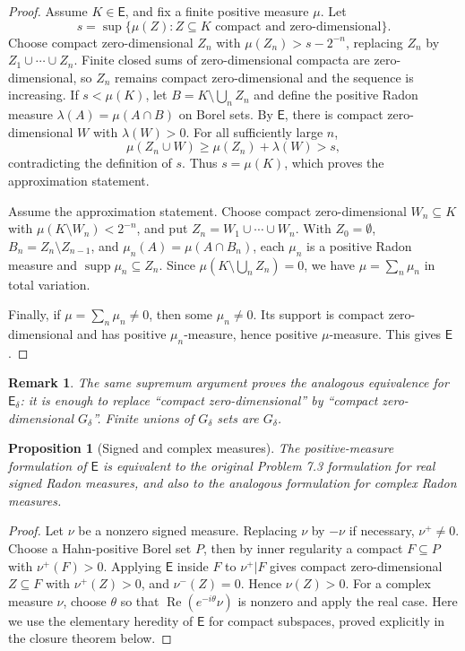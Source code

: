\documentclass[11pt]{article}
\newtheorem{proposition}{Proposition}
\newtheorem{remark}{Remark}
\newcommand{\E}{\mathsf E}
\newcommand{\Ed}{\mathsf E_\delta}
\newcommand{\supp}{\operatorname{supp}}
\begin{document}
\begin{proof}
Assume \(K\in\E\), and fix a finite positive measure \(\mu\).  Let
\[
 s=\sup\{\mu(Z):Z\subseteq K\text{ compact and zero-dimensional}\}.
\]
Choose compact zero-dimensional \(Z_n\) with \(\mu(Z_n)>s-2^{-n}\), replacing
\(Z_n\) by \(Z_1\cup\cdots\cup Z_n\).  Finite closed sums of zero-dimensional
compacta are zero-dimensional, so \(Z_n\) remains compact zero-dimensional and
the sequence is increasing.  If \(s<\mu(K)\), let \(B=K\setminus\bigcup_n Z_n\)
and define the positive Radon measure \(\lambda(A)=\mu(A\cap B)\) on Borel
sets.  By \(\E\), there is compact zero-dimensional \(W\) with
\(\lambda(W)>0\).  For all sufficiently large \(n\),
\[
  \mu(Z_n\cup W)\ge \mu(Z_n)+\lambda(W)>s,
\]
contradicting the definition of \(s\).  Thus \(s=\mu(K)\), which proves the
approximation statement.

Assume the approximation statement.  Choose compact zero-dimensional
\(W_n\subseteq K\) with \(\mu(K\setminus W_n)<2^{-n}\), and put
\(Z_n=W_1\cup\cdots\cup W_n\).  With \(Z_0=\emptyset\), \(B_n=Z_n\setminus
Z_{n-1}\), and \(\mu_n(A)=\mu(A\cap B_n)\), each \(\mu_n\) is a positive Radon
measure and \(\supp\mu_n\subseteq Z_n\).  Since \(\mu(K\setminus\bigcup_n
Z_n)=0\), we have \(\mu=\sum_n\mu_n\) in total variation.

Finally, if \(\mu=\sum_n\mu_n\neq0\), then some \(\mu_n\neq0\).  Its support is
compact zero-dimensional and has positive \(\mu_n\)-measure, hence positive
\(\mu\)-measure.  This gives \(\E\).
\end{proof}

\begin{remark}
The same supremum argument proves the analogous equivalence for \(\Ed\): it is
enough to replace ``compact zero-dimensional'' by ``compact zero-dimensional
\(G_\delta\)''.  Finite unions of \(G_\delta\) sets are \(G_\delta\).
\end{remark}

\begin{proposition}[Signed and complex measures]
The positive-measure formulation of \(\E\) is equivalent to the original
Problem 7.3 formulation for real signed Radon measures, and also to the
analogous formulation for complex Radon measures.
\end{proposition}

\begin{proof}
Let \(\nu\) be a nonzero signed measure.  Replacing \(\nu\) by \(-\nu\) if
necessary, \(\nu^+\neq0\).  Choose a Hahn-positive Borel set \(P\), then by
inner regularity a compact \(F\subseteq P\) with \(\nu^+(F)>0\).  Applying
\(\E\) inside \(F\) to \(\nu^+|F\) gives compact zero-dimensional
\(Z\subseteq F\) with \(\nu^+(Z)>0\), and \(\nu^-(Z)=0\).  Hence
\(\nu(Z)>0\).  For a complex measure \(\nu\), choose \(\theta\) so that
\(\operatorname{Re}(e^{-i\theta}\nu)\) is nonzero and apply the real case.
Here we use the elementary heredity of \(\E\) for compact subspaces, proved
explicitly in the closure theorem below.
\end{proof}
\end{document}
